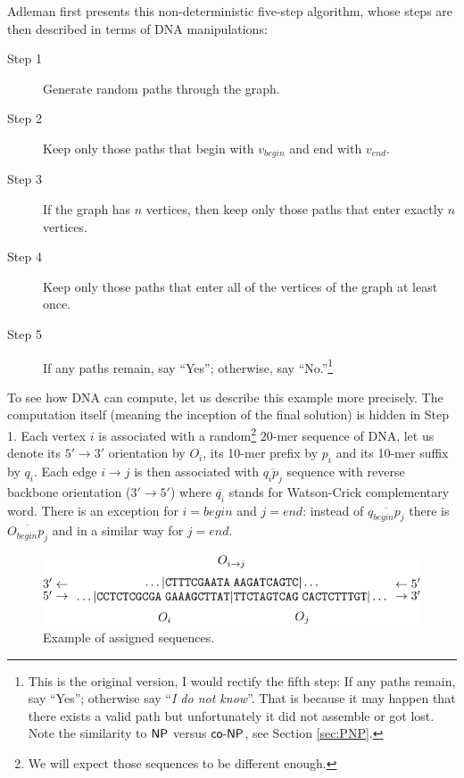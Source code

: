 		Adleman first presents this non-deterministic five-step algorithm, whose steps are then described in terms of DNA manipulations:
		\begin{description}
			\item[Step 1] Generate random paths through the graph.
			\item[Step 2] Keep only those paths that begin with $v_{begin}$ and end with $v_{end}$.
			\item[Step 3] If the graph has $n$ vertices, then keep only those paths that enter exactly $n$ vertices.
			\item[Step 4] Keep only those paths that enter all of the vertices of the graph at least once.
			\item[Step 5] If any paths remain, say ``Yes''; otherwise, say ``No.''\footnote{This is the original version, I would rectify the fifth step: If any paths remain, say ``Yes''; otherwise say ``{\em I do not know}''. That is because it may happen that there exists a valid path but unfortunately it did not assemble or got lost. Note the similarity to $\mathsf{NP}$ versus $\mathsf{co}\textnormal{-}\mathsf{NP}$, see Section \ref{sec:PNP}.} %
		\end{description}
		To see %
		how DNA can compute, let us describe this example more precisely. The computation itself (meaning the inception of the final solution) is hidden in Step 1. Each vertex $i$ is associated with a random\footnote{We will expect those sequences to be different enough.} $20$-mer sequence of DNA, let us denote its $5'\rightarrow 3'$ orientation by $O_i$, its 10-mer prefix by $p_i$ and its 10-mer suffix by $q_i$. Each edge $i\rightarrow j$ is then associated with $\overline{q_i p_j}$ sequence with reverse backbone orientation ($3'\rightarrow 5'$) where $\overline{q_i}$ stands for Watson-Crick complementary word. There is an exception for $i=begin$ and $j=end$: instead of $\overline{q_{begin} p_j}$ there is $\overline{O_{begin} p_j}$ and in a similar way for $j=end$.
		
		\begin{figure}[H]
		\begin{center}
			\includegraphics{./figures/adleman_strands.pdf}
			\caption{Example of assigned sequences.}
			\label{fig:adleman_strands}
		\end{center}
		\end{figure}
		
